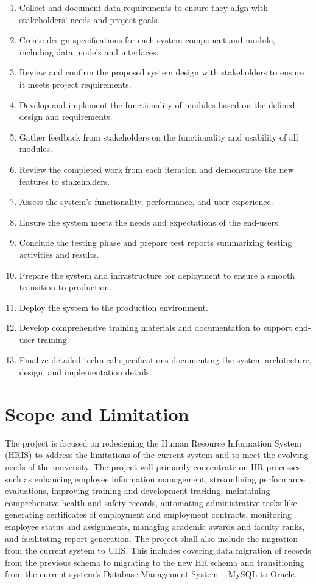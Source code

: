     \begin{enumerate}
        \item Collect and document data requirements to ensure they align with stakeholders' needs and project goals.
        \item Create design specifications for each system component and module, including data models and interfaces.
        \item Review and confirm the proposed system design with stakeholders to ensure it meets project requirements.
        \item Develop and implement the functionality of modules based on the defined design and requirements.

        \item Gather feedback from stakeholders on the functionality and usability of all modules.
        \item Review the completed work from each iteration and demonstrate the new features to stakeholders.
        \item Assess the system's functionality, performance, and user experience.
        \item Ensure the system meets the needs and expectations of the end-users.
        \item Conclude the testing phase and prepare test reports summarizing testing activities and results.
        \item Prepare the system and infrastructure for deployment to ensure a smooth transition to production.
        \item Deploy the system to the production environment.
        \item Develop comprehensive training materials and documentation to support end-user training.
        \item Finalize detailed technical specifications documenting the system architecture, design, and implementation details.
    \end{enumerate}
    
\section{Scope and Limitation}

    The project is focused on redesigning the Human Resource Information System (HRIS) to address the limitations of the current system and to meet the evolving needs of the university. The project will primarily concentrate on HR processes such as enhancing employee information management, streamlining performance evaluations, improving training and development tracking, maintaining comprehensive health and safety records, automating administrative tasks like generating certificates of employment and employment contracts, monitoring employee status and assignments, managing academic awards and faculty ranks, and facilitating report generation. The project shall also include the migration from the current system to UIIS. This includes covering data migration of records from the previous schema to migrating to the new HR schema and transitioning from the current system's Database Management System -- MySQL to Oracle.
    
